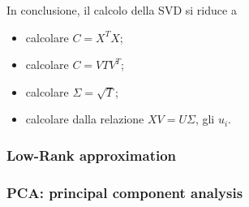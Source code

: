 \documentclass{subfiles}
\begin{document}
\noindent In conclusione, il calcolo della SVD si riduce a
\begin{itemize}
    \item calcolare $C = X^{T}X$;
    \item calcolare $C = V T V^{T}$;
    \item calcolare $\Sigma = \sqrt{T}$;
    \item calcolare dalla relazione $XV = U\Sigma$, gli $u_{i}$.
\end{itemize}
\clearpage

\subsubsection{Low-Rank approximation}


\subsubsection{PCA: principal component analysis}

\end{document}
